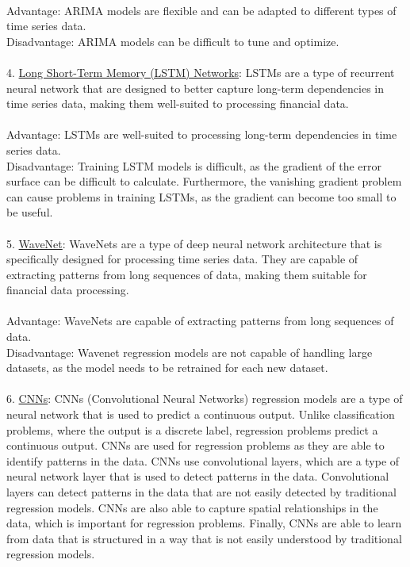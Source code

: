 \documentclass{article}
\begin{document}
\\
Advantage: ARIMA models are flexible and can be adapted to different types of time series data.\\
Disadvantage: ARIMA models can be difficult to tune and optimize.\\
\\
4. \href{https://www.sciencedirect.com/science/article/pii/S1877050920304865}{Long Short-Term Memory (LSTM) Networks}: LSTMs are a type of recurrent neural network that are designed to better capture long-term dependencies in time series data, making them well-suited to processing financial data.\\
\\
Advantage: LSTMs are well-suited to processing long-term dependencies in time series data.\\
Disadvantage: Training LSTM models is difficult, as the gradient of the error surface can be difficult to calculate. Furthermore, the vanishing gradient problem can cause problems in training LSTMs, as the gradient can become too small to be useful.\\
\\
5. \href{https://ieeexplore.ieee.org/abstract/document/4059381}{WaveNet}: WaveNets are a type of deep neural network architecture that is specifically designed for processing time series data. They are capable of extracting patterns from long sequences of data, making them suitable for financial data processing.\\
\\
Advantage: WaveNets are capable of extracting patterns from long sequences of data.\\
Disadvantage: Wavenet regression models are not capable of handling large datasets, as the model needs to be retrained for each new dataset.\\
\\
6. \href{https://www.sciencedirect.com/science/article/abs/pii/S0957417419301915}{CNNs}: CNNs (Convolutional Neural Networks) regression models are a type of neural network that is used to predict a continuous output. Unlike classification problems, where the output is a discrete label, regression problems predict a continuous output. CNNs are used for regression problems as they are able to identify patterns in the data. CNNs use convolutional layers, which are a type of neural network layer that is used to detect patterns in the data. Convolutional layers can detect patterns in the data that are not easily detected by traditional regression models. CNNs are also able to capture spatial relationships in the data, which is important for regression problems. Finally, CNNs are able to learn from data that is structured in a way that is not easily understood by traditional regression models.\\
\end{document}
